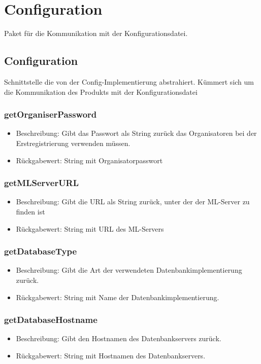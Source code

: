 \documentclass[a4paper]{scrreprt}
\begin{document}
    \section{Configuration}
    Paket für die Kommunikation mit der Konfigurationsdatei.

    \subsection{Configuration}
    Schnittstelle die von der Config-Implementierung abstrahiert.
    Kümmert sich um die Kommunikation des Produkts mit der Konfigurationsdatei

    \subsubsection{getOrganiserPassword}
    \begin{itemize}
        \item Beschreibung: Gibt das Passwort als String zurück das Organisatoren bei der Erstregistrierung verwenden müssen.
        \item Rückgabewert: String mit Organisatorpasswort
    \end{itemize}

    \subsubsection{getMLServerURL}
    \begin{itemize}
        \item Beschreibung: Gibt die URL als String zurück, unter der der ML-Server zu finden ist
        \item Rückgabewert: String mit URL des ML-Servers
    \end{itemize}

    \subsubsection{getDatabaseType}
    \begin{itemize}
        \item Beschreibung: Gibt die Art der verwendeten Datenbankimplementierung zurück.
        \item Rückgabewert: String mit Name der Datenbankimplementierung.
    \end{itemize}

    \subsubsection{getDatabaseHostname}
    \begin{itemize}
        \item Beschreibung: Gibt den Hostnamen des Datenbankservers zurück.
        \item Rückgabewert: String mit Hostnamen des Datenbankservers.
    \end{itemize}
\end{document}
